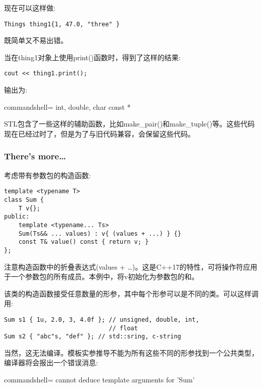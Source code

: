 现在可以这样做:

\begin{lstlisting}[style=styleCXX]
Things thing1{1, 47.0, "three" }
\end{lstlisting}

既简单又不易出错。

当在thing1对象上使用print()函数时，得到了这样的结果:

\begin{lstlisting}[style=styleCXX]
cout << thing1.print();
\end{lstlisting}

输出为:

\begin{tcblisting}{commandshell={}}
int, double, char const *
\end{tcblisting}

STL包含了一些这样的辅助函数，比如make\_pair()和make\_tuple()等。这些代码现在已经过时了，但是为了与旧代码兼容，会保留这些代码。

\subsubsection{There's more…}

考虑带有参数包的构造函数:

\begin{lstlisting}[style=styleCXX]
template <typename T>
class Sum {
	T v{};
public:
	template <typename... Ts>
	Sum(Ts&& ... values) : v{ (values + ...) } {}
	const T& value() const { return v; }
};
\end{lstlisting}

注意构造函数中的折叠表达式(values + …)。这是C++17的特性，可将操作符应用于一个参数包的所有成员。本例中，将v初始化为参数包的和。

该类的构造函数接受任意数量的形参，其中每个形参可以是不同的类。可以这样调用:

\begin{lstlisting}[style=styleCXX]
Sum s1 { 1u, 2.0, 3, 4.0f }; // unsigned, double, int,
							 // float
Sum s2 { "abc"s, "def" }; // std::sring, c-string
\end{lstlisting}

当然，这无法编译。模板实参推导不能为所有这些不同的形参找到一个公共类型，编译器将会报出一个错误消息:

\begin{tcblisting}{commandshell={}}
cannot deduce template arguments for 'Sum'
\end{tcblisting}

